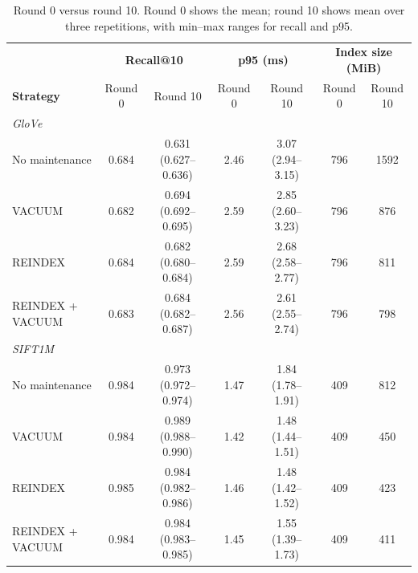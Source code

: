 \begin{table}[H]
\centering
\footnotesize
\caption{Round 0 versus round 10. Round 0 shows the mean; round 10 shows mean over three repetitions, with min--max ranges for recall and p95.}
\label{tab:round0-vs-round10}
\begin{tabular}{lcccccc}
\hline
& \multicolumn{2}{c}{\textbf{Recall@10}} & \multicolumn{2}{c}{\textbf{p95 (ms)}} & \multicolumn{2}{c}{\textbf{Index size (MiB)}} \\
\textbf{Strategy} & Round 0 & Round 10 & Round 0 & Round 10 & Round 0 & Round 10 \\
\hline
\multicolumn{7}{l}{\textit{GloVe}} \\
No maintenance & 0.684 & 0.631 (0.627--0.636) & 2.46 & 3.07 (2.94--3.15) & 796 & 1592 \\
VACUUM & 0.682 & 0.694 (0.692--0.695) & 2.59 & 2.85 (2.60--3.23) & 796 & 876 \\
REINDEX & 0.684 & 0.682 (0.680--0.684) & 2.59 & 2.68 (2.58--2.77) & 796 & 811 \\
REINDEX + VACUUM & 0.683 & 0.684 (0.682--0.687) & 2.56 & 2.61 (2.55--2.74) & 796 & 798 \\
\hline
\multicolumn{7}{l}{\textit{SIFT1M}} \\
No maintenance & 0.984 & 0.973 (0.972--0.974) & 1.47 & 1.84 (1.78--1.91) & 409 & 812 \\
VACUUM & 0.984 & 0.989 (0.988--0.990) & 1.42 & 1.48 (1.44--1.51) & 409 & 450 \\
REINDEX & 0.985 & 0.984 (0.982--0.986) & 1.46 & 1.48 (1.42--1.52) & 409 & 423 \\
REINDEX + VACUUM & 0.984 & 0.984 (0.983--0.985) & 1.45 & 1.55 (1.39--1.73) & 409 & 411 \\
\hline
\end{tabular}
\end{table}

